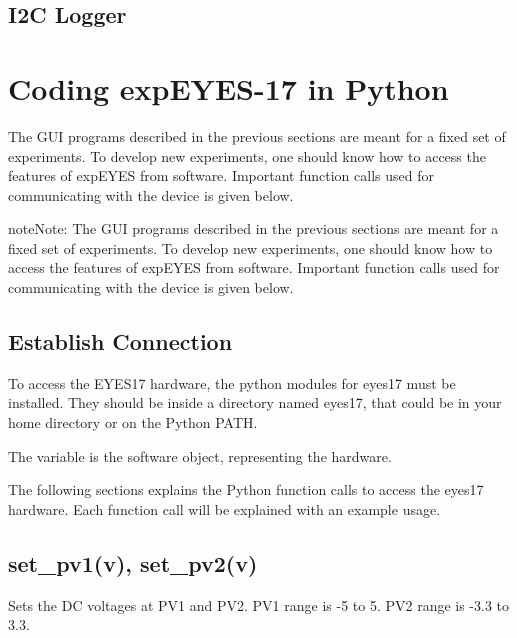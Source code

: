 \documentclass[a4paper,12pt,english]{sphinxmanual}
\begin{document}
\section{I2C Logger}
\label{\detokenize{8.4:i2c-logger}}\label{\detokenize{8.4::doc}}

\chapter{Coding expEYES-17 in Python}
\label{\detokenize{index:coding-expeyes-17-in-python}}
The GUI programs described in the previous sections are meant for a
fixed set of experiments. To develop new experiments, one should know
how to access the features of expEYES from software. Important function
calls used for communicating with the device is given below.

\begin{sphinxadmonition}{note}{Note:}
The GUI programs described in the previous sections are meant for a
fixed set of experiments. To develop new experiments, one should know
how to access the features of expEYES from software. Important function
calls used for communicating with the device is given below.
\end{sphinxadmonition}


\section{Establish Connection}
\label{\detokenize{9.0:establish-connection}}\label{\detokenize{9.0::doc}}
To access the EYES17 hardware, the python modules for eyes17 must be
installed. They should be inside a directory named eyes17, that could be
in your home directory or on the Python PATH. 

\begin{sphinxVerbatim}[commandchars=\\\{\}]
 
  
\end{sphinxVerbatim}

The variable  is the software object, representing the hardware.

The following sections explains the Python function calls to access the
eyes17 hardware. Each function call will be explained with an example
usage.


\section{set\_pv1(v), set\_pv2(v)}
\label{\detokenize{9.0:set-pv1-v-set-pv2-v}}
Sets the DC voltages at PV1 and PV2. PV1 range is -5 to 5. PV2 range is
-3.3 to 3.3.
\end{document}
